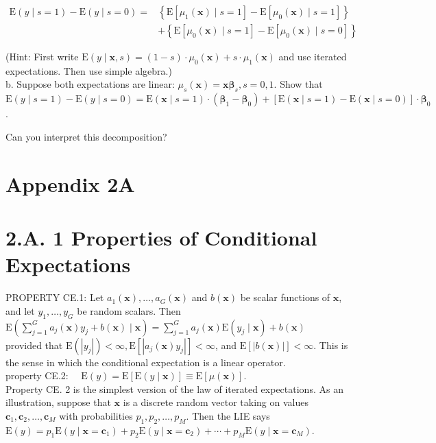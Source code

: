 \documentclass[10pt]{article}
\begin{document}
$$
\begin{aligned}
\mathrm{E}(y \mid s=1)-\mathrm{E}(y \mid s=0)= & \left\{\mathrm{E}\left[\mu_{1}(\mathbf{x}) \mid s=1\right]-\mathrm{E}\left[\mu_{0}(\mathbf{x}) \mid s=1\right]\right\} \\
& +\left\{\mathrm{E}\left[\mu_{0}(\mathbf{x}) \mid s=1\right]-\mathrm{E}\left[\mu_{0}(\mathbf{x}) \mid s=0\right]\right\}
\end{aligned}
$$

(Hint: First write $\mathrm{E}(y \mid \mathbf{x}, s)=(1-s) \cdot \mu_{0}(\mathbf{x})+s \cdot \mu_{1}(\mathbf{x})$ and use iterated expectations. Then use simple algebra.)\\
b. Suppose both expectations are linear: $\mu_{s}(\mathbf{x})=\mathbf{x} \boldsymbol{\beta}_{s}, s=0,1$. Show that $\mathrm{E}(y \mid s=1)-\mathrm{E}(y \mid s=0)=\mathrm{E}(\mathbf{x} \mid s=1) \cdot\left(\boldsymbol{\beta}_{1}-\boldsymbol{\beta}_{0}\right)+[\mathrm{E}(\mathbf{x} \mid s=1)-\mathrm{E}(\mathbf{x} \mid s=0)] \cdot \boldsymbol{\beta}_{0}$.

Can you interpret this decomposition?

\section*{Appendix 2A}
\section*{2.A. 1 Properties of Conditional Expectations}
PROPERTY CE.1: Let $a_{1}(\mathbf{x}), \ldots, a_{G}(\mathbf{x})$ and $b(\mathbf{x})$ be scalar functions of $\mathbf{x}$, and let $y_{1}, \ldots, y_{G}$ be random scalars. Then\\
$\mathrm{E}\left(\sum_{j=1}^{G} a_{j}(\mathbf{x}) y_{j}+b(\mathbf{x}) \mid \mathbf{x}\right)=\sum_{j=1}^{G} a_{j}(\mathbf{x}) \mathrm{E}\left(y_{j} \mid \mathbf{x}\right)+b(\mathbf{x})$\\
provided that $\mathrm{E}\left(\left|y_{j}\right|\right)<\infty, \mathrm{E}\left[\left|a_{j}(\mathbf{x}) y_{j}\right|\right]<\infty$, and $\mathrm{E}[|b(\mathbf{x})|]<\infty$. This is the sense in which the conditional expectation is a linear operator.\\
property CE.2: $\quad \mathrm{E}(y)=\mathrm{E}[\mathrm{E}(y \mid \mathbf{x})] \equiv \mathrm{E}[\mu(\mathbf{x})]$.\\
Property CE. 2 is the simplest version of the law of iterated expectations. As an illustration, suppose that $\mathbf{x}$ is a discrete random vector taking on values $\mathbf{c}_{1}, \mathbf{c}_{2}, \ldots, \mathbf{c}_{M}$ with probabilities $p_{1}, p_{2}, \ldots, p_{M}$. Then the LIE says\\
$\mathrm{E}(y)=p_{1} \mathrm{E}\left(y \mid \mathbf{x}=\mathbf{c}_{1}\right)+p_{2} \mathrm{E}\left(y \mid \mathbf{x}=\mathbf{c}_{2}\right)+\cdots+p_{M} \mathrm{E}\left(y \mid \mathbf{x}=\mathbf{c}_{M}\right)$.
\end{document}
